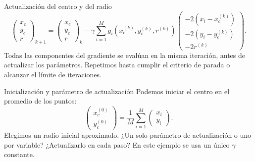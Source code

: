 \documentclass[original_version/main.tex]{subfiles}
\begin{document}
\begin{frame}[t]{Actualización del centro y del radio}
\small
\[\begin{pmatrix}x_c\\y_c\\r\end{pmatrix}_{k+1}
=\begin{pmatrix}x_c\\y_c\\r\end{pmatrix}_k
-\gamma\sum_{i=1}^M g_i(x_c^{(k)},y_c^{(k)},r^{(k)})
\begin{pmatrix}-2(x_i-x_c^{(k)})\\-2(y_i-y_c^{(k)})\\-2r^{(k)}\end{pmatrix}.\]
Todas las componentes del gradiente se evalúan en la misma iteración, antes de actualizar los parámetros.
\medskip
Repetimos hasta cumplir el criterio de parada o alcanzar el límite de iteraciones.
\end{frame}
\begin{frame}[t]{Inicialización y parámetro de actualización}
Podemos iniciar el centro en el promedio de los puntos:
\[\begin{pmatrix}x_c^{(0)}\\y_c^{(0)}\end{pmatrix}
=\frac1M\sum_{i=1}^M\begin{pmatrix}x_i\\y_i\end{pmatrix}.\]
Elegimos un radio inicial aproximado.
\medskip
¿Un solo parámetro de actualización o uno por variable? ¿Actualizarlo en cada paso?
\medskip
En este ejemplo se usa un único $\gamma$ constante.
\end{frame}
\end{document}
